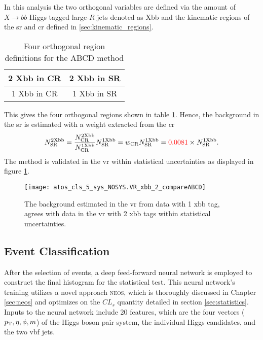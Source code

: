 In this analysis the two orthogonal variables are defined via the amount of $X\rightarrow bb$ Higgs tagged large-$R$ jets denoted as Xbb and the kinematic regions of the \ac{sr} and \ac{cr} defined in \ref{sec:kinematic_regions}.
\begin{table}[htbp]
    \centering
    \caption{Four orthogonal region definitions for the ABCD method}
    \begin{tabular}{|c|c|}
        \hline
        2 Xbb in CR & 2 Xbb in SR \\ \hline
        1 Xbb in CR & 1 Xbb in SR \\ \hline
    \end{tabular}
    \label{tab:abcd}
\end{table}
This gives the four orthogonal regions shown in table \ref{tab:abcd}. Hence, the background in the \ac{sr} is estimated with a weight extracted from the \ac{cr}
\begin{equation}
    N_\text{SR}^\text{2Xbb}=\frac{N_\text{CR}^\text{2Xbb}}{N_\text{CR}^\text{1Xbb}} N_\text{SR}^\text{1Xbb} = w_\text{CR} N_\text{SR}^\text{1Xbb}=  \textcolor{red}{0.0081} \times N_\text{SR}^\text{1Xbb}.
\end{equation}
The method is validated in the \ac{vr} within statistical uncertainties as displayed in figure \ref{fig:bkg-validation}.
\begin{figure}
    \centering
    \texttt{[image: atos\_cls\_5\_sys\_NOSYS.VR\_xbb\_2\_compareABCD]}
    \caption[]{The background estimated in the \ac{vr} from data with 1 xbb tag, agrees with data in the \ac{vr} with 2 xbb tags within statistical uncertainties.}
    \label{fig:bkg-validation}
\end{figure}





\subsection{Event Classification}
After the selection of events, a deep feed-forward neural network is employed to construct the final histogram for the statistical test. This neural network's training utilizes a novel approach \textsc{neos}, which is thoroughly discussed in Chapter \ref{sec:neos} and optimizes on the $CL_s$ quantity detailed in section \ref{sec:statistics}. Inputs to the neural network include 20 features, which are the four vectors ($p_{\text{T}},\eta,\phi,m$) of the Higgs boson pair system, the individual Higgs candidates, and the two \ac{vbf} jets.

